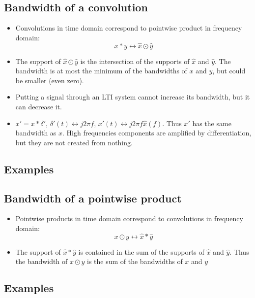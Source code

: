 \documentclass{ximera}
\begin{document}
\subsection{Bandwidth of a convolution}
  \begin{itemize}
  \item Convolutions in time domain correspond to pointwise product in frequency domain:
    \[
      x * y \leftrightarrow \hat{x} \odot \hat{y}
    \]
  \item The support of $\hat{x} \odot \hat{y}$ is the intersection of the supports of $\hat{x}$ and $\hat{y}$. The bandwidth is at most the minimum of the bandwidths of $x$ and $y$, but could be smaller (even zero).
  \item Putting a signal through an LTI system cannot increase its bandwidth, but it can decrease it.
  \item $x' = x * \delta'$, $\delta'(t) \leftrightarrow j2\pi f$, $x'(t) \leftrightarrow j2\pi f \hat{x}(f)$. Thus $x'$ has the same bandwidth as $x$. High frequencies components are amplified by differentiation, but they are not created from nothing.
  \end{itemize}


\subsection{Examples}



\subsection{Bandwidth of a pointwise product}
  \begin{itemize}
  \item Pointwise products in time domain correspond to convolutions in frequency domain:
    \[
      x \odot y \leftrightarrow \hat{x} * \hat{y}
    \]
  \item The support of $\hat{x} * \hat{y}$ is contained in the sum of the supports of $\hat{x}$ and $\hat{y}$. Thus the bandwidth of $x \odot y$ is the sum of the bandwidths of $x$ and $y$
  \end{itemize}
  \vspace{3cm}


\subsection{Examples}
\end{document}
